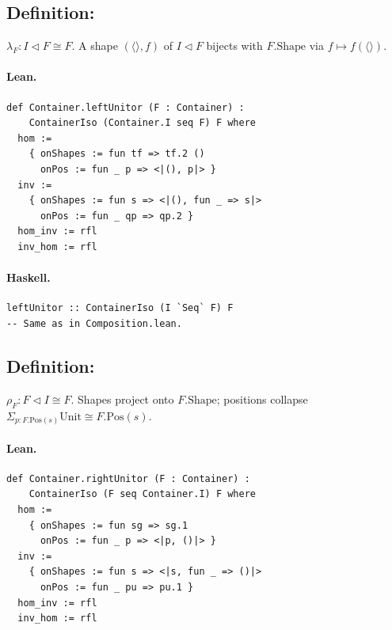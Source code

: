 \documentclass[11pt,a4paper]{article}
\begin{document}
\subsection{Definition: }

\begin{defn}
$\lambda_F : I \triangleleft F \cong F$.  A shape $(\langle\rangle, f)$ of
$I \triangleleft F$ bijects with $F.\mathrm{Shape}$ via $f \mapsto f(\langle\rangle)$.
\end{defn}

\paragraph{Lean.}
\begin{lstlisting}[style=lean]
def Container.leftUnitor (F : Container) :
    ContainerIso (Container.I seq F) F where
  hom :=
    { onShapes := fun tf => tf.2 ()
      onPos := fun _ p => <|(), p|> }
  inv :=
    { onShapes := fun s => <|(), fun _ => s|>
      onPos := fun _ qp => qp.2 }
  hom_inv := rfl
  inv_hom := rfl
\end{lstlisting}

\paragraph{Haskell.}
\begin{lstlisting}[style=haskell]
leftUnitor :: ContainerIso (I `Seq` F) F
-- Same as in Composition.lean.
\end{lstlisting}


\subsection{Definition: }

\begin{defn}
$\rho_F : F \triangleleft I \cong F$.  Shapes project onto $F.\mathrm{Shape}$;
positions collapse $\Sigma_{p : F.\mathrm{Pos}(s)} \mathrm{Unit} \cong F.\mathrm{Pos}(s)$.
\end{defn}

\paragraph{Lean.}
\begin{lstlisting}[style=lean]
def Container.rightUnitor (F : Container) :
    ContainerIso (F seq Container.I) F where
  hom :=
    { onShapes := fun sg => sg.1
      onPos := fun _ p => <|p, ()|> }
  inv :=
    { onShapes := fun s => <|s, fun _ => ()|>
      onPos := fun _ pu => pu.1 }
  hom_inv := rfl
  inv_hom := rfl
\end{lstlisting}
\end{document}

